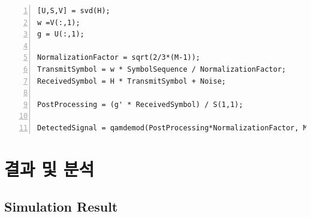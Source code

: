 \documentclass{article}
\begin{document}
\begin{lstlisting}[style=Matlab-editor, frame=single, numbers=left,]
% S = svd(A) returns the singular values of matrix A in descending order.
[U,S,V] = svd(H);
w =V(:,1);
g = U(:,1);

NormalizationFactor = sqrt(2/3*(M-1));
TransmitSymbol = w * SymbolSequence / NormalizationFactor;
ReceivedSymbol = H * TransmitSymbol + Noise;

PostProcessing = (g' * ReceivedSymbol) / S(1,1);

DetectedSignal = qamdemod(PostProcessing*NormalizationFactor, M);
\end{lstlisting}

\section{결과 및 분석}
\subsection{Simulation Result}
\end{document}
